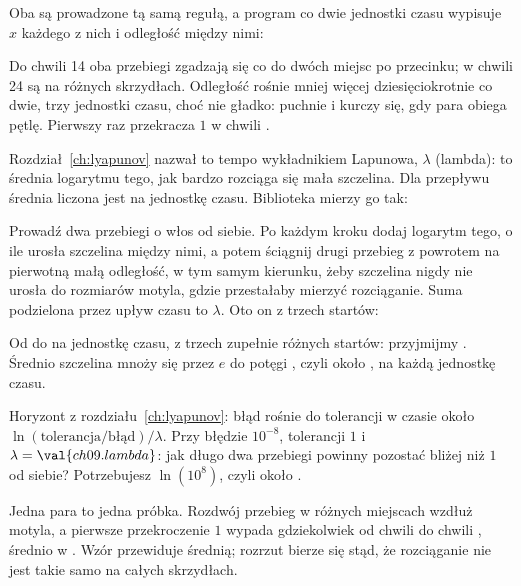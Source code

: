 
\noindent
Oba są prowadzone tą samą regułą, a program co dwie jednostki czasu wypisuje
$x$ każdego z nich i odległość między nimi:


\noindent
Do chwili 14 oba przebiegi zgadzają się co do dwóch miejsc po przecinku; w
chwili 24 są na różnych skrzydłach. Odległość rośnie mniej więcej
dziesięciokrotnie co dwie, trzy jednostki czasu, choć nie gładko: puchnie i
kurczy się, gdy para obiega pętlę. Pierwszy raz przekracza $1$ w chwili
.

Rozdział~\ref{ch:lyapunov} nazwał to tempo wykładnikiem Lapunowa, $\lambda$
(lambda): to średnia logarytmu tego, jak bardzo rozciąga się mała szczelina.
Dla przepływu średnia liczona jest na jednostkę czasu. Biblioteka mierzy go
tak:


\noindent
Prowadź dwa przebiegi o włos od siebie. Po każdym kroku dodaj logarytm tego,
o ile urosła szczelina między nimi, a potem ściągnij drugi przebieg z
powrotem na pierwotną małą odległość, w tym samym kierunku, żeby szczelina
nigdy nie urosła do rozmiarów motyla, gdzie przestałaby mierzyć rozciąganie.
Suma podzielona przez upływ czasu to $\lambda$. Oto on z trzech startów:



\noindent
Od  do  na jednostkę czasu, z
trzech zupełnie różnych startów: przyjmijmy . Średnio
szczelina mnoży się przez $e$ do potęgi , czyli około
, na każdą jednostkę czasu.

\begin{think}
Horyzont z rozdziału~\ref{ch:lyapunov}: błąd rośnie do tolerancji w czasie
około $\ln(\text{tolerancja} / \text{błąd}) / \lambda$. Przy błędzie
$10^{-8}$, tolerancji $1$ i $\lambda = \val{ch09.lambda}$: jak długo dwa
przebiegi powinny pozostać bliżej niż $1$ od siebie? Potrzebujesz
$\ln(10^{8})$, czyli około .
\end{think}
Jedna para to jedna próbka. Rozdwój przebieg w 
różnych miejscach wzdłuż motyla, a pierwsze przekroczenie $1$ wypada
gdziekolwiek od chwili  do chwili ,
średnio w . Wzór przewiduje średnią; rozrzut bierze się
stąd, że rozciąganie nie jest takie samo na całych skrzydłach.

